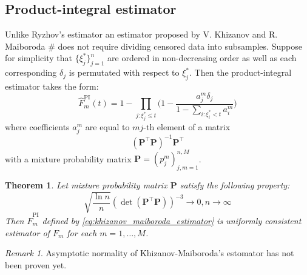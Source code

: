 \documentclass[12pt,reqno,a4paper,oneside]{article}
\theoremstyle{plain}
\newtheorem{thm}{Theorem}[section]
\theoremstyle{definition}
\theoremstyle{remark}
\newtheorem*{rem}{Remark}
\begin{document}
\subsection{Product-integral estimator}
Unlike Ryzhov's estimator an estimator proposed by V. Khizanov and R. Maiboroda $\#$ does not require dividing censored data into subsamples. Suppose for simplicity that $\{\xi ^* _j\}_{j=1}^n$ are ordered in non-decreasing order as well as each corresponding $\delta_j$ is permutated with respect to $\xi ^*_j$. Then the product-integral estimator takes the form:
\begin{equation}
\label{eq:khizanov_maiboroda_estimator}
\hat F^{\mathrm{PI}}_m(t) = 1 - \prod _{j : \xi ^*_j \leq t}\bigg( 1 - \frac {a_j^m \delta _j}{1 - \sum _{i:\xi ^*_i < t} a_i^m} \bigg)
\end{equation}
where coefficients $a_j^m$ are equal to $mj$-th element of a matrix
\begin{equation}
(\mathbf P^\top \mathbf P)^{-1}\mathbf P^\top
\end{equation}
with a mixture probability matrix $\mathbf P=(p_{j}^m)_{j,m=1}^{n, M}$.
\begin{thm}
Let mixture probability matrix $\mathbf P$ satisfy the following property: 
\begin{equation*}
\sqrt{\frac{\ln n}{n}}(\det (\mathbf P^\top \mathbf P))^{-3} \to 0, n \to \infty
\end{equation*}
Then $\hat F^{\mathrm{PI}}_m$ defined by \eqref{eq:khizanov_maiboroda_estimator} is uniformly consistent estimator of $F_m$ for each $m=1,\ldots, M$.
\end{thm}
\begin{rem}
Asymptotic normality of Khizanov-Maiboroda's estomator has not been proven yet.
\end{rem}
\end{document}
